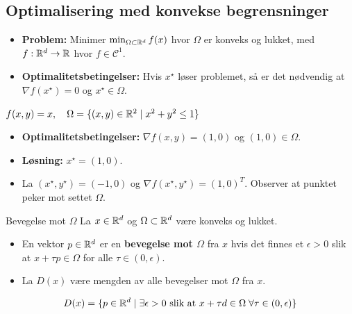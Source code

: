 \subsection*{Optimalisering med konvekse begrensninger}
\begin{itemize}
  \item \textbf{Problem:} Minimer \(\min_{\Omega \subset \mathbb{R}^d} f(x)\) hvor \(\Omega\) er konveks og lukket, med \(f: \mathbb{R}^d \to \mathbb{R}\) hvor \(f\in \mathcal{C}^1\).
  \item \textbf{Optimalitetsbetingelser:} Hvis \(x^\star\) løser problemet, så er det nødvendig at \(\nabla f(x^\star) = 0\) og \(x^\star \in \Omega\).
\end{itemize}

\begin{example}{\(f(x,y)=x, \quad \Omega = \{(x,y) \in \mathbb{R}^2 \mid x^2 + y^2 \leq 1\}\)}{}
  \begin{itemize}
    \item \textbf{Optimalitetsbetingelser:} \(\nabla f(x,y) = (1,0)\) og \((1,0) \in \Omega\).
    \item \textbf{Løsning:} \(x^\star = (1,0)\).
    \item La \((x^\star, y^\star)=(-1,0) \) og \(\nabla f(x^\star, y^\star) = (1,0)^T \). Observer at punktet peker mot settet \(\Omega\).
  \end{itemize}


\end{example}


\begin{definition}{Bevegelse mot \(\Omega\)}{}
  La \(x \in \mathbb{R}^d\) og \(\Omega \subset \mathbb{R}^d\) være konveks og lukket.
  \begin{itemize}
    \item En vektor \(p \in \mathbb{R}^d\) er en \textbf{bevegelse mot \(\Omega\)} fra \(x\) hvis det finnes et \(\epsilon > 0\) slik at \(x + \tau p \in \Omega\) for alle \(\tau \in (0, \epsilon)\).
    \item La \(D(x)\) være mengden av alle bevegelser mot \(\Omega\) fra \(x\).
  \end{itemize}

  \[
    D(x) = \{p \in \mathbb{R}^d \mid \exists \epsilon > 0 \text{ slik at } x + \tau d \in \Omega \; \forall \tau \in (0, \epsilon)\}
  \]

\end{definition}

